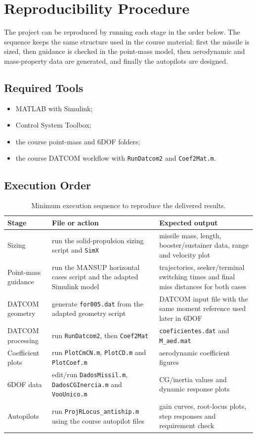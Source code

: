 \section{Reproducibility Procedure}

The project can be reproduced by running each stage in the order below. The sequence keeps the same structure used in the course material: first the missile is sized, then guidance is checked in the point-mass model, then aerodynamic and mass-property data are generated, and finally the autopilots are designed.

\subsection{Required Tools}

\begin{itemize}
    \item MATLAB with Simulink;
    \item Control System Toolbox;
    \item the course point-mass and 6DOF folders;
    \item the course DATCOM workflow with \texttt{RunDatcom2} and \texttt{Coef2Mat.m}.
\end{itemize}

\subsection{Execution Order}

\begin{table}[H]
\centering
\small
\caption{Minimum execution sequence to reproduce the delivered results.}
\begin{tabular}{p{}p{}p{}}
\toprule
Stage & File or action & Expected output \\
\midrule
Sizing & run the solid-propulsion sizing script and \texttt{SimX} & missile mass, length, booster/sustainer data, range and velocity plot \\
Point-mass guidance & run the MANSUP horizontal cases script and the adapted Simulink model & trajectories, seeker/terminal switching times and final miss distances for both cases \\
DATCOM geometry & generate \texttt{for005.dat} from the adapted geometry script & DATCOM input file with the same moment reference used later in 6DOF \\
DATCOM processing & run \texttt{RunDatcom2}, then \texttt{Coef2Mat} & \texttt{coeficientes.dat} and \texttt{M\_aed.mat} \\
Coefficient plots & run \texttt{PlotCmCN.m}, \texttt{PlotCD.m} and \texttt{PlotCoef.m} & aerodynamic coefficient figures \\
6DOF data & edit/run \texttt{DadosMissil.m}, \texttt{DadosCGInercia.m} and \texttt{VooUnico.m} & CG/inertia values and dynamic response plots \\
Autopilots & run \texttt{ProjRLocus\_antiship.m} using the course autopilot files & gain curves, root-locus plots, step responses and requirement check \\
\bottomrule
\end{tabular}
\end{table}

